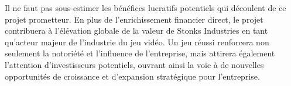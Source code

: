 Il ne faut pas sous-estimer les bénéfices lucratifs potentiels qui découlent de ce projet prometteur. 
En plus de l'enrichissement financier direct, le projet contribuera à l'élévation globale de la valeur de Stonks Industries en tant qu'acteur majeur de l'industrie du jeu vidéo. 
Un jeu réussi renforcera non seulement la notoriété et l'influence de l'entreprise, mais attirera également l'attention d'investisseurs potentiels, ouvrant ainsi la voie à de nouvelles opportunités de croissance et d'expansion stratégique pour l'entreprise.


